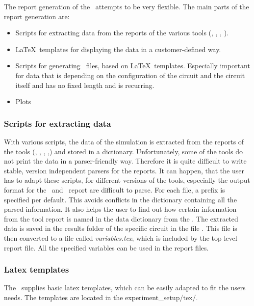 The report generation of the \invt\ attempts to be very
flexible. The main parts of the report generation are: 
\begin{itemize}
\item Scripts for extracting data from the reports of the various tools 
(\hspice, \spectre, \dc, \primetime). 
\item \LaTeX\ templates for displaying the data in a customer-defined way. 
\item Scripts for generating \texfile\ files, based on \LaTeX\ templates. 
Especially important for data that is depending on the configuration of the 
circuit and the circuit itself and has no fixed length and is recurring. 
\item Plots
\end{itemize}

\subsubsection{Scripts for extracting data}
\label{sec:man-report-scripts-for-extracting-data}

With various scripts, the data of the simulation is extracted from the
reports of the tools (\hspice, \spectre, \dc, \primetime,) and
stored in a dictionary. Unfortunately, some of the tools do not print
the data in a parser-friendly way. Therefore it is quite difficult to
write stable, version independent parsers for the reports. It can
happen, that the user has to adapt these scripts, for different versions
of the tools, especially the output format for the \dc\ and \primetime\ report 
are difficult to parse. For each file, a prefix is specified per default. 
This avoids conflicts in the dictionary containing all the parsed information. 
It also helps the user to find out how certain information from the tool report 
is named in the data
dictionary from the \invt. The extracted data is saved in the
results folder of the specific circuit in the file \resultsjson.
This file is then converted to a file called \emph{variables.tex}, which
is included by the top level report file. All the specified variables
can be used in the report files.

\subsubsection{Latex templates}
\label{sec:man-report-latex-templates}

The \invt\ supplies basic latex templates, which can be easily
adapted to fit the users needs. The templates are located in the
experiment\_setup/tex/.


